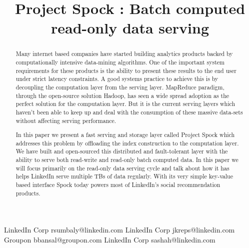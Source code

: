 \documentclass[10pt,twocolumn,preprint,natbib,authoryear]{sigplanconf}
\begin{document}
\copyrightdata{[to be supplied]} 

\newcommand{\projectname}{Spock}


\title{Project \projectname{} : Batch computed read-only data serving}

           {LinkedIn Corp}
           {rsumbaly@linkedin.com}
           {LinkedIn Corp}
           {jkreps@linkedin.com}
		   {Groupon}
           {bbansal@groupon.com}
           {LinkedIn Corp}
           {sashah@linkedin.com}


				
\maketitle

\begin{abstract}
Many internet based companies have started building analytics products backed by computationally intensive data-mining algorithms. One of the important system requirements for these products is the ability to present these results to the end user under strict latency constraints. A good systems practice to achieve this is by decoupling the computation layer from the serving layer. MapReduce paradigm, through the open-source solution Hadoop, has seen a wide spread adoption as the perfect solution for the computation layer. But it is the current serving layers which haven't been able to keep up and deal with the consumption of these massive data-sets without affecting serving performance. 

In this paper we present a fast serving and storage layer called Project \projectname{} which addresses this problem by offloading the index construction to the computation layer. We have built and open-sourced this distributed and fault-tolerant layer with the ability to serve both read-write and read-only batch computed data. In this paper we will focus primarily on the read-only data serving cycle and talk about how it has helps LinkedIn serve multiple TBs of data regularly. With its very simple key-value based interface \projectname{} today powers most of LinkedIn's social recommendation products. 
\end{abstract}
\end{document}
